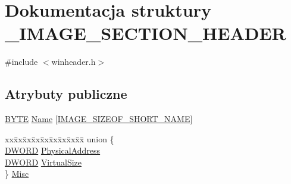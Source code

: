 \hypertarget{struct___i_m_a_g_e___s_e_c_t_i_o_n___h_e_a_d_e_r}{\section{Dokumentacja struktury \-\_\-\-I\-M\-A\-G\-E\-\_\-\-S\-E\-C\-T\-I\-O\-N\-\_\-\-H\-E\-A\-D\-E\-R}
\label{struct___i_m_a_g_e___s_e_c_t_i_o_n___h_e_a_d_e_r}
}


{\ttfamily \#include $<$winheader.\-h$>$}

\subsection*{Atrybuty publiczne}
\begin{DoxyCompactItemize}
\item 
\hyperlink{winheader_8h_aae9749d96e15ccb4f482dd5f55d98f9b}{B\-Y\-T\-E} \hyperlink{struct___i_m_a_g_e___s_e_c_t_i_o_n___h_e_a_d_e_r_acdad09df74f03f4e7611b735edbff5f8}{Name} \mbox{[}\hyperlink{winheader_8h_a98e3229bbf99bf35eaebf248b173d235}{I\-M\-A\-G\-E\-\_\-\-S\-I\-Z\-E\-O\-F\-\_\-\-S\-H\-O\-R\-T\-\_\-\-N\-A\-M\-E}\mbox{]}
\item 
\begin{tabbing}
xx\=xx\=xx\=xx\=xx\=xx\=xx\=xx\=xx\=\kill
union \{\\
\>\hyperlink{winheader_8h_af483253b2143078cede883fc3c111ad2}{DWORD} \hyperlink{struct___i_m_a_g_e___s_e_c_t_i_o_n___h_e_a_d_e_r_acd4b267168f34a33618c57c4446e5d0c}{PhysicalAddress}\\
\>\hyperlink{winheader_8h_af483253b2143078cede883fc3c111ad2}{DWORD} \hyperlink{struct___i_m_a_g_e___s_e_c_t_i_o_n___h_e_a_d_e_r_ae141e4583b36e2ea9b564b420e7e7c49}{VirtualSize}\\
\} \hyperlink{struct___i_m_a_g_e___s_e_c_t_i_o_n___h_e_a_d_e_r_a22c8f85326fe46618b630841d07a4afd}{Misc}\\


\end{tabbing}
\end{DoxyCompactItemize}

